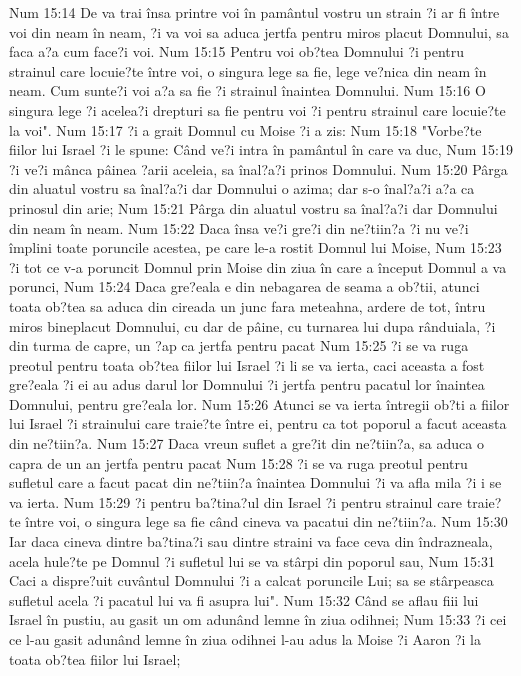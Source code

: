 Num 15:14  De va trai însa printre voi în pamântul vostru un strain ?i ar fi între voi din neam în neam, ?i va voi sa aduca jertfa pentru miros placut Domnului, sa faca a?a cum face?i voi.
Num 15:15  Pentru voi ob?tea Domnului ?i pentru strainul care locuie?te între voi, o singura lege sa fie, lege ve?nica din neam în neam. Cum sunte?i voi a?a sa fie ?i strainul înaintea Domnului.
Num 15:16  O singura lege ?i acelea?i drepturi sa fie pentru voi ?i pentru strainul care locuie?te la voi".
Num 15:17  ?i a grait Domnul cu Moise ?i a zis:
Num 15:18  "Vorbe?te fiilor lui Israel ?i le spune: Când ve?i intra în pamântul în care va duc,
Num 15:19  ?i ve?i mânca pâinea ?arii aceleia, sa înal?a?i prinos Domnului.
Num 15:20  Pârga din aluatul vostru sa înal?a?i dar Domnului o azima; dar s-o înal?a?i a?a ca prinosul din arie;
Num 15:21  Pârga din aluatul vostru sa înal?a?i dar Domnului din neam în neam.
Num 15:22  Daca însa ve?i gre?i din ne?tiin?a ?i nu ve?i împlini toate poruncile acestea, pe care le-a rostit Domnul lui Moise,
Num 15:23  ?i tot ce v-a poruncit Domnul prin Moise din ziua în care a început Domnul a va porunci,
Num 15:24  Daca gre?eala e din nebagarea de seama a ob?tii, atunci toata ob?tea sa aduca din cireada un junc fara meteahna, ardere de tot, întru miros bineplacut Domnului, cu dar de pâine, cu turnarea lui dupa rânduiala, ?i din turma de capre, un ?ap ca jertfa pentru pacat
Num 15:25  ?i se va ruga preotul pentru toata ob?tea fiilor lui Israel ?i li se va ierta, caci aceasta a fost gre?eala ?i ei au adus darul lor Domnului ?i jertfa pentru pacatul lor înaintea Domnului, pentru gre?eala lor.
Num 15:26  Atunci se va ierta întregii ob?ti a fiilor lui Israel ?i strainului care traie?te între ei, pentru ca tot poporul a facut aceasta din ne?tiin?a.
Num 15:27  Daca vreun suflet a gre?it din ne?tiin?a, sa aduca o capra de un an jertfa pentru pacat
Num 15:28  ?i se va ruga preotul pentru sufletul care a facut pacat din ne?tiin?a înaintea Domnului ?i va afla mila ?i i se va ierta.
Num 15:29  ?i pentru ba?tina?ul din Israel ?i pentru strainul care traie?te între voi, o singura lege sa fie când cineva va pacatui din ne?tiin?a.
Num 15:30  Iar daca cineva dintre ba?tina?i sau dintre straini va face ceva din îndrazneala, acela hule?te pe Domnul ?i sufletul lui se va stârpi din poporul sau,
Num 15:31  Caci a dispre?uit cuvântul Domnului ?i a calcat poruncile Lui; sa se stârpeasca sufletul acela ?i pacatul lui va fi asupra lui".
Num 15:32  Când se aflau fiii lui Israel în pustiu, au gasit un om adunând lemne în ziua odihnei;
Num 15:33  ?i cei ce l-au gasit adunând lemne în ziua odihnei l-au adus la Moise ?i Aaron ?i la toata ob?tea fiilor lui Israel;
